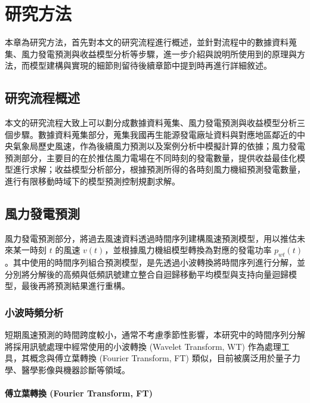 
\chapter{研究方法}

本章為研究方法，首先對本文的研究流程進行概述，並針對流程中的數據資料蒐集、風力發電預測與收益模型分析等步驟，進一步介紹與說明所使用到的原理與方法，而模型建構與實現的細節則留待後續章節中提到時再進行詳細敘述。

\section{研究流程概述}

本文的研究流程大致上可以劃分成數據資料蒐集、風力發電預測與收益模型分析三個步驟。數據資料蒐集部分，蒐集我國再生能源發電廠址資料與對應地區鄰近的中央氣象局歷史風速，作為後續風力預測以及案例分析中模擬計算的依據；風力發電預測部分，主要目的在於推估風力電場在不同時刻的發電數量，提供收益最佳化模型進行求解；收益模型分析部分，根據預測所得的各時刻風力機組預測發電數量，進行有限移動時域下的模型預測控制規劃求解。

\section{風力發電預測}

風力發電預測部分，將過去風速資料透過時間序列建構風速預測模型，用以推估未來某一時刻 $t$ 的風速 $v(t)$，並根據風力機組模型轉換為對應的發電功率 $p_{wt}(t)$。其中使用的時間序列組合預測模型，是先透過小波轉換將時間序列進行分解，並分別將分解後的高頻與低頻訊號建立整合自迴歸移動平均模型與支持向量迴歸模型，最後再將預測結果進行重構。

\subsection{小波時頻分析}

短期風速預測的時間跨度較小，通常不考慮季節性影響，本研究中的時間序列分解將採用訊號處理中經常使用的小波轉換 (Wavelet Transform, WT) 作為處理工具，其概念與傅立葉轉換 (Fourier Transform, FT) 類似，目前被廣泛用於量子力學、醫學影像與機器診斷等領域。

\subsubsection{傅立葉轉換 (Fourier Transform, FT)}

